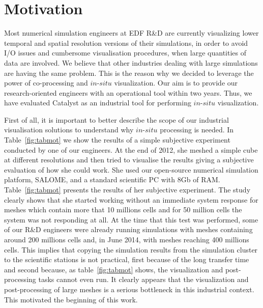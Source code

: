 \section{Motivation}
\label{sec:motivation}

Most numerical simulation engineers at EDF R\&D are currently visualizing lower
temporal and spatial resolution versions of their simulations, in order to avoid
I/O issues and cumbersome visualisation procedures, when large quantities of
data are involved. We believe that other industries dealing with large
simulations are having the same problem. This is the reason why we decided to
leverage the power of co-processing and $in$-$situ$ visualization. Our aim is to
provide our research-oriented engineers with an operational tool within two
years. Thus, we have evaluated Catalyst as an industrial tool for performing
$in$-$situ$ visualization. 

First of all, it is important to better describe the scope of our industrial
visualisation solutions to understand why $in$-$situ$ processing is needed. In
Table~\ref{fig:tabmot} we show the results of a simple subjective experiment 
conducted by one of our engineers. At the end of 2012, she meshed 
a simple cube at different resolutions and then tried to visualise the results 
giving a subjective evaluation of how she could work. She used  
our open-source numerical simulation platform, SALOME,
and a standard scientific PC with 8Gb of RAM. Table~\ref{fig:tabmot} presents
the results of her subjective experiment. The study clearly shows that she
started working without an immediate system response for meshes which contain
more that 10 millions cells and for 50 million cells the system was not
responding at all. At the time that this test was performed, some of our R\&D engineers
were already running simulations with meshes containing around 200 millions cells and, 
in June 2014, with meshes reaching 400 millions cells. This implies that copying the
simulation results from the simulation cluster to the scientific stations is not practical, first
because of the long transfer time and second because, as table~\ref{fig:tabmot} shows,
the visualization and post-processing tasks cannot even run. 
It clearly appears that the visualization and post-processing of large meshes is
a serious bottleneck in this industrial context. This motivated the beginning of this work.

